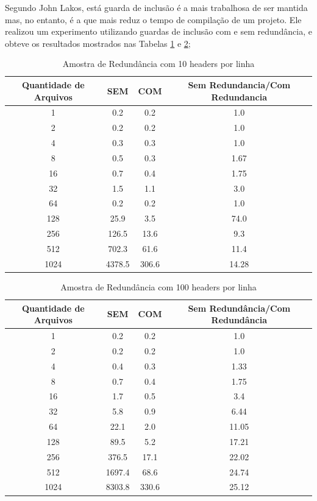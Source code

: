 \begin{enumerate}
Segundo John Lakos, está guarda de inclusão é a mais trabalhosa de ser mantida
 mas, no entanto, é a que mais reduz o tempo de compilação de um projeto. Ele
 realizou um experimento utilizando guardas de inclusão com e sem redundância,
 e obteve os resultados mostrados nas Tabelas \ref{tab:tabela_01} e 
\ref{tab:tabela_02};

\begin{table}
    \centering
    \begin{tabular}{ |c | c | c | c |}
    \hline
    Quantidade de Arquivos & SEM & COM & Sem Redundancia/Com Redundancia\\
    \hline
    1 & 0.2 & 0.2 & 1.0\\
    \hline
    2 & 0.2 & 0.2 & 1.0\\
    \hline
    4 & 0.3 & 0.3 & 1.0\\
    \hline
    8 & 0.5 & 0.3 & 1.67\\
    \hline
    16 & 0.7 & 0.4 & 1.75\\
    \hline
    32 & 1.5 & 1.1 & 3.0\\
    \hline
    64 & 0.2 & 0.2 & 1.0\\
    \hline
    128 & 25.9 & 3.5 & 74.0\\
    \hline
    256 & 126.5 & 13.6 & 9.3\\
    \hline
    512 & 702.3 & 61.6 & 11.4\\
    \hline
    1024 & 4378.5 & 306.6 & 14.28\\
    \hline
    \end{tabular}
    \caption {Amostra de Redundância com 10 headers por linha}
    \label{tab:tabela_01}
\end{table}

\begin{table}[h]
    \centering
    \begin{tabular}{ |c | c | c | c |}
    \hline
    Quantidade de Arquivos & SEM & COM & Sem Redundância/Com Redundância\\
    \hline
    1 & 0.2 & 0.2 & 1.0\\
    \hline
    2 & 0.2 & 0.2 & 1.0\\
    \hline
    4 & 0.4 & 0.3 & 1.33\\
    \hline
    8 & 0.7 & 0.4 & 1.75\\
    \hline
    16 & 1.7 & 0.5 & 3.4\\
    \hline
    32 & 5.8 & 0.9 & 6.44\\
    \hline
    64 & 22.1 & 2.0 & 11.05\\
    \hline
    128 & 89.5 & 5.2 & 17.21\\
    \hline
    256 & 376.5 & 17.1 & 22.02\\
    \hline
    512 & 1697.4 & 68.6 & 24.74\\
    \hline
    1024 & 8303.8 & 330.6 & 25.12\\
    \hline
    \end{tabular}
    \caption {Amostra de Redundância com 100 headers por linha }
    \label{tab:tabela_02}
\end{table}


\end{enumerate}
